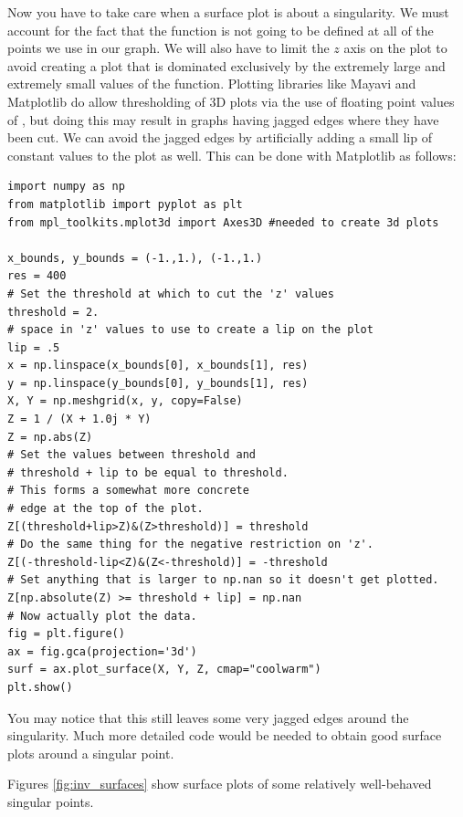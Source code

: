 Now you have to take care when a surface plot is about a singularity.  We must account for the fact that the function is not going to be defined at all of the points we use in our graph.
We will also have to limit the $z$ axis on the plot to avoid creating a plot that is dominated exclusively by the extremely large and extremely small values of the function.
Plotting libraries like Mayavi and Matplotlib do allow thresholding of 3D plots via the use of floating point values of , but doing this may result in graphs having jagged edges where they have been cut.
We can avoid the jagged edges by artificially adding a small lip of constant values to the plot as well.
This can be done with Matplotlib as follows:
\begin{lstlisting}
import numpy as np
from matplotlib import pyplot as plt
from mpl_toolkits.mplot3d import Axes3D #needed to create 3d plots

x_bounds, y_bounds = (-1.,1.), (-1.,1.)
res = 400
# Set the threshold at which to cut the 'z' values
threshold = 2.
# space in 'z' values to use to create a lip on the plot
lip = .5
x = np.linspace(x_bounds[0], x_bounds[1], res)
y = np.linspace(y_bounds[0], y_bounds[1], res)
X, Y = np.meshgrid(x, y, copy=False)
Z = 1 / (X + 1.0j * Y)
Z = np.abs(Z)
# Set the values between threshold and
# threshold + lip to be equal to threshold.
# This forms a somewhat more concrete
# edge at the top of the plot.
Z[(threshold+lip>Z)&(Z>threshold)] = threshold
# Do the same thing for the negative restriction on 'z'.
Z[(-threshold-lip<Z)&(Z<-threshold)] = -threshold
# Set anything that is larger to np.nan so it doesn't get plotted.
Z[np.absolute(Z) >= threshold + lip] = np.nan
# Now actually plot the data.
fig = plt.figure()
ax = fig.gca(projection='3d')
surf = ax.plot_surface(X, Y, Z, cmap="coolwarm")
plt.show()
\end{lstlisting}
You may notice that this still leaves some very jagged edges around the singularity.
Much more detailed code would be needed to obtain good surface plots around a singular point.

Figures \ref{fig:inv_surfaces} show surface plots of some relatively well-behaved singular points.


